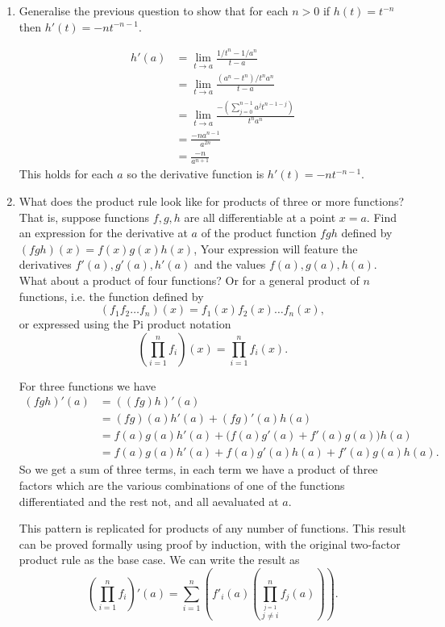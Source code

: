 \documentclass[10pt]{memoir}
\begin{document}
\begin{enumerate}
\item
Generalise the previous question to show that for each $n>0$ if $h(t) = t^{-n}$ then $h'(t) = -n t^{-n-1}$.
\begin{solution}
\begin{align*}
h'(a) &= \lim_{t \to a} \frac{1/t^n - 1/a^n}{t-a}\\
&=\lim_{t \to a} \frac{(a^n-t^n)/t^na^n}{t-a}\\
&=\lim_{t \to a} \frac{-\left (\sum_{j=0}^{n-1} a^jt^{n-1-j} \right )}{t^na^n}\\
&= \frac{-na^{n-1}}{a^{2n}}\\
&=\frac{-n}{a^{n+1}}
\end{align*}
This holds for each $a$ so the derivative function is $h'(t)=-nt^{-n-1}$.
\end{solution}

\item
What does the product rule look like for products of three or more functions? That is, suppose functions $f,g,h$ are all differentiable at a point $x=a$. Find an expression for the derivative at $a$ of the product function $fgh$ defined by $(fgh)(x)=f(x)g(x)h(x)$, Your expression will feature the derivatives $f'(a), g'(a),h'(a)$ and the values $f(a),g(a),h(a)$. What about a product of four functions? Or for a general product of $n$ functions, i.e. the function defined by
$$(f_1 f_2 \dots f_n)(x) =  f_1(x) f_2(x) \dots f_n(x),$$
or expressed using the Pi product notation
$$\left ( \prod_{i=1}^n f_i \right ) (x) = \prod_{i=1}^n f_i(x) .$$
\begin{solution}
For three functions we have
\begin{align*}
(fgh)'(a) &= ((fg)h)'(a) \\
&=(fg)(a)h'(a) + (fg)'(a)h(a)\\
&=f(a)g(a)h'(a) + \big (f(a)g'(a) + f'(a)g(a)\big )h(a) \\
&= f(a)g(a)h'(a) + f(a)g'(a)h(a) + f'(a)g(a)h(a).
\end{align*}
So we get a sum of three terms, in each term we have a product of three factors which are the various combinations of one of the functions differentiated and the rest not, and all aevaluated at $a$.

This pattern is replicated for products of any number of functions. This result can be proved formally using proof by induction, with the original two-factor product rule as the base case. We can write the result as
$$\left ( \prod_{i=1}^n f_i \right )' (a) = \sum_{i=1}^n \left ( f'_i(a) \left ( \prod_{\overset{j=1}{j \neq i}}^n f_j (a) \right ) \right ).$$


\end{solution}
\end{enumerate}
\end{document}
